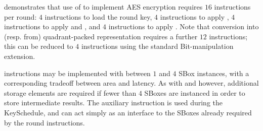 demonstrates that use of 
to implement AES encryption requires
$16$ instructions per round:
$ 4$ 
     instructions to load the round key,
$ 4$ 
     instructions to apply ,
$ 4$ 
     instructions to apply  and ,
     and
$ 4$ 
     instructions to apply .
Note that conversion into (resp. from) quadrant-packed representation
requires a further
$12$ instructions;
     this can be reduced to
$ 4$ 
     instructions using the 
     standard 
     Bit-manipulation ~\cite[Section 17]{RV:ISA:I:19}
     extension.

 instructions may be implemented with between $1$ and $4$
SBox instances, with a corresponding tradeoff between area and
latency.
As with  and  however, additional storage elements
are required if fewer than $4$ SBoxes are instanced in order to
store intermediate results.
The auxiliary  instruction is used during the
KeySchedule, and can act simply as an interface to the SBoxes
already required by the round instructions.


